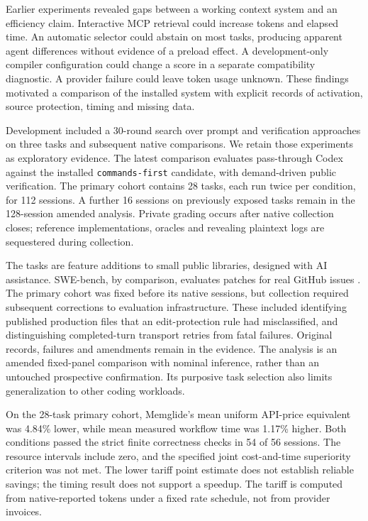 \documentclass[manuscript,screen,nonacm]{acmart}
\begin{document}
Earlier experiments revealed gaps between a working context system and
an efficiency claim. Interactive MCP retrieval could increase tokens and
elapsed time. An automatic selector could abstain on most tasks,
producing apparent agent differences without evidence of a preload
effect. A development-only compiler configuration could change a score
in a separate compatibility diagnostic. A provider failure could leave
token usage unknown. These findings motivated a comparison of the
installed system with explicit records of activation, source protection,
timing and missing data.

Development included a 30-round search over prompt and verification
approaches on three tasks and subsequent native comparisons. We retain
those experiments as exploratory evidence. The latest comparison
evaluates pass-through Codex against the installed
\texttt{commands-first} candidate, with demand-driven public
verification. The primary cohort contains 28 tasks, each run twice per
condition, for 112 sessions. A further 16 sessions on previously exposed
tasks remain in the 128-session amended analysis. Private grading occurs
after native collection closes; reference implementations, oracles and
revealing plaintext logs are sequestered during collection.

The tasks are feature additions to small public libraries, designed with
AI assistance. SWE-bench, by comparison, evaluates patches for real
GitHub issues \citep{jimenez2024swebench}. The primary cohort was fixed
before its native sessions, but collection required subsequent
corrections to evaluation infrastructure. These included identifying
published production files that an edit-protection rule had
misclassified, and distinguishing completed-turn transport retries from
fatal failures. Original records, failures and amendments remain in the
evidence. The analysis is an amended fixed-panel comparison with nominal
inference, rather than an untouched prospective confirmation. Its
purposive task selection also limits generalization to other coding
workloads.

On the 28-task primary cohort, Memglide's mean uniform API-price
equivalent was 4.84\% lower, while mean measured workflow time was
1.17\% higher. Both conditions passed the strict finite correctness
checks in 54 of 56 sessions. The resource intervals include zero, and
the specified joint cost-and-time superiority criterion was not met. The
lower tariff point estimate does not establish reliable savings; the
timing result does not support a speedup. The tariff is computed from
native-reported tokens under a fixed rate schedule, not from provider
invoices.
\end{document}
